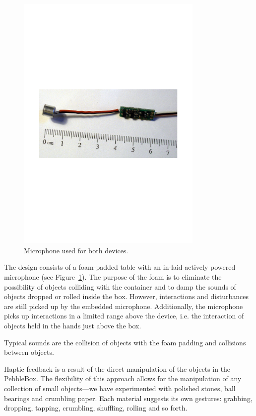 \begin{figure}[t]
\centering
\includegraphics[width=90mm]{Mic-trimmed2s-eps-converted-to.pdf}
\caption{Microphone used for both devices.}
\label{Omodhrain:fig:mic}
\end{figure}

The design consists of a foam-padded table with an in-laid actively
powered microphone (see Figure~\ref{Omodhrain:fig:mic}). The purpose of the foam
is to eliminate the possibility of objects colliding with the container and to damp the sounds of objects dropped or rolled inside the
box. However, interactions and disturbances are still picked up by the
embedded microphone.  Additionally, the microphone picks up
interactions in a limited range above the device, i.e. the interaction of objects held in the hands just above the box.

Typical sounds are the collision of objects with the foam padding
and collisions between objects.

Haptic feedback is a result of the direct manipulation of
the objects in the PebbleBox. The flexibility of this approach allows for the manipulation of any collection of small objects---we have experimented with polished stones, ball bearings and crumbling paper. Each material suggests its own gestures: grabbing, dropping, tapping, crumbling, shuffling,
rolling and so forth.

